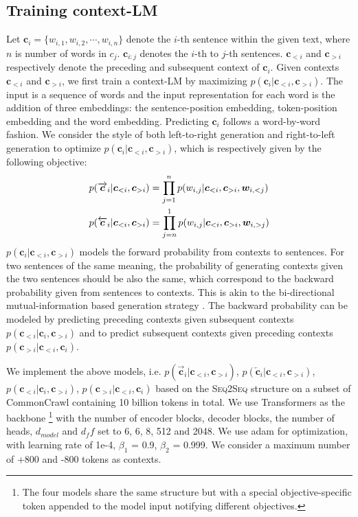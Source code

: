 \documentclass[11pt,a4paper]{article}
\newcommand{\sts}{{{\textsc{Seq2Seq}}}\xspace}
\begin{document}
\subsection{Training context-LM}
Let $\bm{c}_i=\{w_{i,1}, w_{i,2}, \cdots, w_{i,n}\}$ denote the  $i$-th sentence within the given text, where $n$ is number of words in  $c_j$. $\bm{c}_{i:j}$ denotes the $i$-th to $j$-th sentences. $\bm{c}_{<i}$ and $\bm{c}_{>i}$ respectively denote the preceding and subsequent context of $\bm{c}_i$.
Given  contexts $\bm{c}_{<i}$ and  $\bm{c}_{>i}$, we first train a context-LM by maximizing $p(\bm{c}_i|\bm{c}_{<i},\bm{c}_{>i})$.
The input is a sequence of words and the input representation for each word is the addition of  three embeddings: the sentence-position embedding, token-position embedding and the word embedding. Predicting $\bm{c}_i$ follows a word-by-word fashion.
We consider the style of both left-to-right generation and right-to-left generation to optimize $p(\bm{c}_i|\bm{c}_{<i},\bm{c}_{>i})$, which is respectively given by the following objective:
\begin{equation}
\normalsize
\begin{aligned}
       p(\overrightarrow{\bm{c}}_i|\bm{c}_{<i},\bm{c}_{>i})&=\prod_{j=1}^np(w_{i,j}|\bm{c}_{<i},\bm{c}_{>i},\bm{w}_{i,<j})\\ p(\overleftarrow{\bm{c}}_i|\bm{c}_{<i},\bm{c}_{>i})&=\prod_{j=n}^1p(w_{i,j}|\bm{c}_{<i},\bm{c}_{>i},\bm{w}_{i,>j})
    \end{aligned}
\end{equation}
$p(\bm{c}_i|\bm{c}_{<i},\bm{c}_{>i})$ models the forward probability from contexts to sentences. 
For two sentences of the same meaning, the probability of generating contexts given the two sentences should be also the same, which correspond to the backward probability given 
from sentences  to contexts. 
This is akin to the 
bi-directional mutual-information based generation strategy
 \citep{fang2015captions,jiwei2016diversity,li2016mutual,wang2021modeling}. 
 The backward probability can be modeled by 
  predicting preceding contexts given subsequent contexts $p(\bm{c}_{<i}|\bm{c}_i,\bm{c}_{>i})$ and to predict subsequent contexts given preceding contexts $p(\bm{c}_{>i}|\bm{c}_{<i},\bm{c}_i)$. 
  
We implement the above models, i.e. $p(\overrightarrow{\bm{c}}_i|\bm{c}_{<i},\bm{c}_{>i})$, $p(\overleftarrow{\bm{c}}_i|\bm{c}_{<i},\bm{c}_{>i})$, $p(\bm{c}_{<i}| \bm{c}_i,\bm{c}_{>i})$,
  $p(\bm{c}_{>i}|\bm{c}_{<i},\bm{c}_i)$
based on the \sts structure on a subset of CommonCrawl containing 10 billion tokens in total.
We use Transformers as the backbone \cite{vaswani2017attention}\footnote{
The four models share the same structure
 but with a special objective-specific token appended to the model input notifying different objectives.}
with the number of encoder blocks, decoder blocks, 
the number of heads,
$d_{model}$ and $d_ff$
 set to 6, 6, 8, 512 and 2048. 
We use adam  \citep{kingma2014adam}  for optimization,
with learning rate of 1e-4, $\beta_1$ = 0.9,
$\beta_2$ = 0.999.
We consider a maximum number of +800 and -800 tokens as contexts. 
\end{document}
